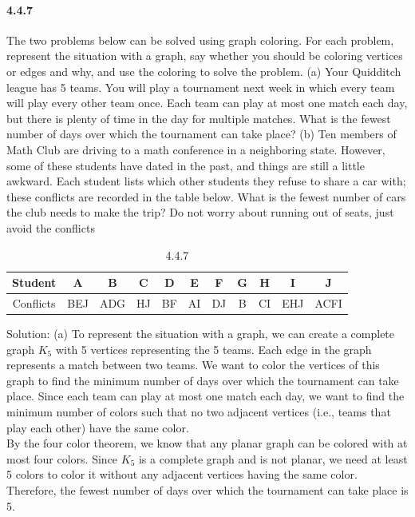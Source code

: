 \documentclass{article}
\begin{document}
\paragraph{4.4.7}
The two problems below can be solved using graph coloring. For each
problem, represent the situation with a graph, say whether you should
be coloring vertices or edges and why, and use the coloring to solve
the problem.\newline
(a) Your Quidditch league has 5 teams. You will play a tournament
next week in which every team will play every other team once.
Each team can play at most one match each day, but there is
plenty of time in the day for multiple matches. What is the fewest
number of days over which the tournament can take place?\newline
(b) Ten members of Math Club are driving to a math conference in a
neighboring state. However, some of these students have dated
in the past, and things are still a little awkward. Each student
lists which other students they refuse to share a car with; these
conflicts are recorded in the table below. What is the fewest
number of cars the club needs to make the trip? Do not worry
about running out of seats, just avoid the conflicts\newline
\begin{table}[H]
\center
\begin{tabular}{|c|c|c|c|c|c|c|c|c|c|c|}
\hline
Student   & A   & B   & C  & D  & E  & F  & G & H  & I   & J    \\ \hline
Conflicts & BEJ & ADG & HJ & BF & AI & DJ & B & CI & EHJ & ACFI \\ \hline
\end{tabular}
\caption{4.4.7}
\label{tab:my-table}
\end{table}
Solution:\newline
(a) To represent the situation with a graph, we can create a complete graph $K_5$ with 5 vertices representing the 5 teams. Each edge in the graph represents a match between two teams. We want to color the vertices of this graph to find the minimum number of days over which the tournament can take place. Since each team can play at most one match each day, we want to find the minimum number of colors such that no two adjacent vertices (i.e., teams that play each other) have the same color.
\\
By the four color theorem, we know that any planar graph can be colored with at most four colors. Since $K_5$ is a complete graph and is not planar, we need at least 5 colors to color it without any adjacent vertices having the same color. Therefore, the fewest number of days over which the tournament can take place is 5.
\end{document}
